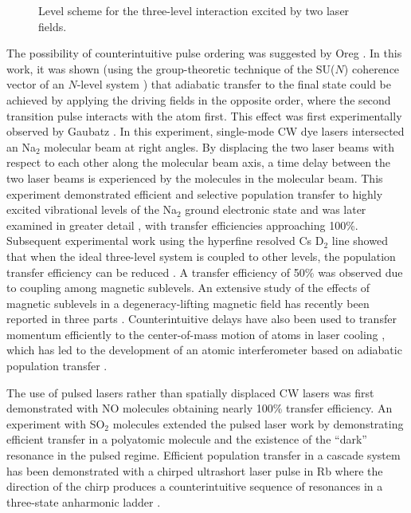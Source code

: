 \begin{figure}[tbp]
\bigskip
{} {Level scheme for the
three-level interaction excited by two laser fields.
\label{apt_levels}}
\end{figure}

The possibility of counterintuitive pulse ordering was suggested by Oreg
\etal \cite{Oreg:84}.  In this work, it was shown (using the group-theoretic
technique of the SU($N$) coherence vector of an $N$-level system
\cite{Hioe:81}) that adiabatic transfer to the final state could be achieved
by applying the driving fields in the opposite order, where the second
transition pulse interacts with the atom first.  This effect was first
experimentally observed by Gaubatz \etal \cite{Gaubatz:88}.  In this
experiment, single-mode CW dye lasers intersected an Na$_2$ molecular beam at
right angles.  By displacing the two laser beams with respect to each other
along the molecular beam axis, a time delay between the two laser beams is
experienced by the molecules in the molecular beam.  This experiment
demonstrated efficient and selective population transfer to highly excited
vibrational levels of the Na$_2$ ground electronic state and was later examined
in greater detail \cite{Gaubatz:90}, with transfer efficiencies approaching
100\%.  Subsequent experimental work using the hyperfine resolved Cs D$_2$ line
showed that when the ideal three-level system is coupled to other levels, the
population transfer efficiency can be reduced \cite{Pillet:93}.  A transfer
efficiency of 50\% was observed due to coupling among magnetic sublevels.  An
extensive study of the effects of magnetic sublevels in a degeneracy-lifting
magnetic field has recently been reported in three parts
\cite{Shore:95b,Martin:95,Martin:96}.  Counterintuitive delays have also been
used to transfer momentum efficiently to the center-of-mass motion of atoms in
laser cooling \cite{Lawall:94,Goldner:94}, which has led to the development of
an atomic interferometer based on adiabatic population transfer
\cite{Weitz:94}.

The use of pulsed lasers rather than spatially displaced CW lasers was first
demonstrated with NO molecules \cite{Schiemann:93} obtaining nearly 100\%
transfer efficiency.  An experiment with SO$_2$ molecules extended the pulsed
laser work by demonstrating efficient transfer in a polyatomic molecule and
the existence of the ``dark'' resonance in the pulsed regime.  Efficient
population transfer in a cascade system has been demonstrated with a chirped
ultrashort laser pulse in Rb where the direction of the chirp produces a
counterintuitive sequence of resonances in a three-state anharmonic
ladder \cite{Broers:92}.

